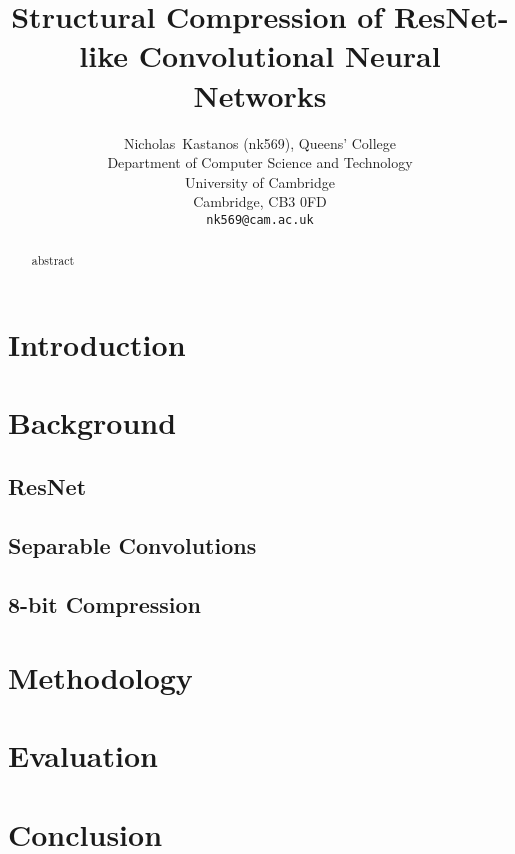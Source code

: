 \documentclass{article}
\title{Structural Compression of ResNet-like Convolutional Neural Networks}
\author{%
	Nicholas~Kastanos (nk569), Queens' College \\
	Department of Computer Science and Technology\\
	University of Cambridge\\
	Cambridge, CB3 0FD\\
	\texttt{nk569@cam.ac.uk} \\
}
\begin{document}
	
	\maketitle
	
	\begin{abstract}
		abstract
	\end{abstract}
	
	\section{Introduction}
	
	
	\section{Background}
	
	\subsection{ResNet}
	
	\subsection{Separable Convolutions}
	
	
	\subsection{8-bit Compression}
	
	\section{Methodology}
	
	\section{Evaluation}
	
	\section{Conclusion}
	
	
	
%	

	
\end{document}
